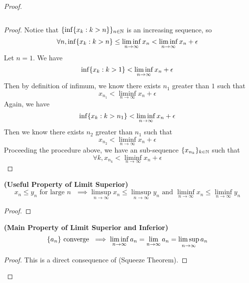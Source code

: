 \documentclass{report}
\begin{document}
\begin{proof}
\begin{theorem}
\begin{equation}
\end{equation}
\end{theorem}
\begin{proof}
Notice that $\{ \inf \{ x_k:k>n \} \}_{n\in\mathbb{N}}$ is an increasing sequence, so
\begin{equation}
\forall n, \inf \{ x_k:k>n \}\leq \liminf_{n\to\infty} x_n<\liminf_{n\to\infty} x_n+\epsilon 
\end{equation}
Let $n=1$. We have
 \begin{equation}
\inf \{ x_k:k>1 \}<\liminf_{n\to\infty}  x_n+\epsilon 
\end{equation}
Then by definition of infimum, we know there exists $n_1$ greater than  $1$ such that
 \begin{equation}
x_{n_1}<\liminf_{n\to\infty} x_n+\epsilon 
\end{equation}
Again, we have
\begin{equation}
\inf \{ x_{k}:k>n_1 \}<\liminf_{n\to\infty} x_n+\epsilon 
\end{equation}
Then we know there exists $n_2$ greater than  $n_1$ such that
 \begin{equation}
x_{n_2}<\liminf_{n\to\infty} x_n+\epsilon 
\end{equation}
Proceeding the procedure above, we have an sub-sequence $\{ x_{n_k} \}_{k\in\mathbb{N}}$ such that
\begin{equation}
\forall k, x_{n_k}<\liminf_{n\to\infty} x_n+\epsilon 
\end{equation}
\end{proof}
\begin{corollary}
\label{2.3.4}
\textbf{(Useful Property of Limit Superior)} 
\begin{equation}
x_n\leq  y_n\text{ for large $n$ }\implies \limsup_{n\to\infty} x_n\leq \limsup_{n\to\infty} y_n\text{ and }\liminf_{n\to\infty}  x_n\leq \liminf_{n\to\infty} y_n
\end{equation}
\end{corollary}
\begin{proof}

\end{proof}
\begin{theorem}
\label{2.3.5}
\textbf{(Main Property of Limit Superior and Inferior)} 
\begin{equation}
\{ a_n \}\text{ converge }\implies \liminf_{n\to\infty} a_n=\lim_{n\to\infty}a_n=\limsup_{n\to\infty} a_n
\end{equation}
\end{theorem}
\begin{proof}
This is a direct consequence of  (Squeeze Theorem). 
\end{proof}
\fbox{\begin{minipage}{39em}


\end{minipage}}
\end{proof}
\end{document}
